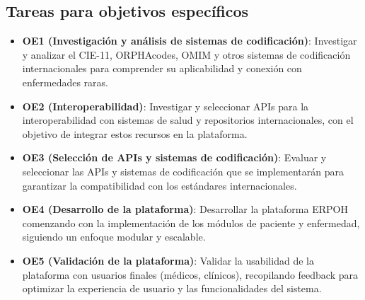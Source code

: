 \documentclass{article}
\begin{document}
\subsection{Tareas para objetivos específicos}
\begin{itemize}[leftmargin=1.2em]
  \item \textbf{OE1 (Investigación y análisis de sistemas de codificación)}: Investigar y analizar el CIE-11, ORPHAcodes, OMIM y otros sistemas de codificación internacionales para comprender su aplicabilidad y conexión con enfermedades raras.
  \item \textbf{OE2 (Interoperabilidad)}: Investigar y seleccionar APIs para la interoperabilidad con sistemas de salud y repositorios internacionales, con el objetivo de integrar estos recursos en la plataforma.
  \item \textbf{OE3 (Selección de APIs y sistemas de codificación)}: Evaluar y seleccionar las APIs y sistemas de codificación que se implementarán para garantizar la compatibilidad con los estándares internacionales.
  \item \textbf{OE4 (Desarrollo de la plataforma)}: Desarrollar la plataforma ERPOH comenzando con la implementación de los módulos de paciente y enfermedad, siguiendo un enfoque modular y escalable.
  \item \textbf{OE5 (Validación de la plataforma)}: Validar la usabilidad de la plataforma con usuarios finales (médicos, clínicos), recopilando feedback para optimizar la experiencia de usuario y las funcionalidades del sistema.
\end{itemize}
\end{document}
